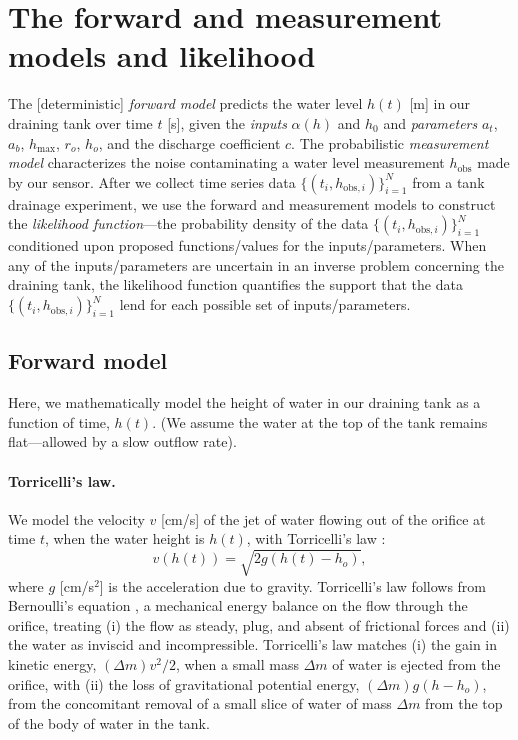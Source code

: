 \documentclass[openacc]{rsproca_new}%
\newcommand\thedata {$\{(t_i,h_{\text{obs}, i})\}_{i=1}^{N}$\xspace}
\begin{document}
\section{The forward and measurement models and likelihood} \label{sec:forward_model}
The [deterministic] \emph{forward model} predicts the water level $h(t)$ [m] in our draining tank over time $t$ [s], given the \emph{inputs} $\alpha(h)$ and $h_0$ and \emph{parameters} $a_t$, $a_b$, $h_{\text{max}}$, $r_o$, $h_o$, and the discharge coefficient $c$. 
The probabilistic \emph{measurement model} characterizes the noise contaminating a water level measurement $h_{\text{obs}}$ made by our sensor.
After we collect time series data \thedata from a tank drainage experiment, we use the forward and measurement models to construct the \emph{likelihood function}---the probability density of the data \thedata conditioned upon proposed functions/values for the inputs/parameters. 
When any of the inputs/parameters are uncertain in an inverse problem concerning the draining tank, the likelihood function quantifies the support that the data \thedata lend for each possible set of inputs/parameters.

\subsection{Forward model}
Here, we mathematically model the height of water in our draining tank as a function of time, $h(t)$. (We assume the water at the top of the tank remains flat---allowed by a slow outflow rate). 

\paragraph{Torricelli's law.}
We model the velocity $v$ [cm/s] of the jet of water flowing out of the orifice at time $t$, when the water height is $h(t)$, with Torricelli's law \cite{d2021torricelli}:
\begin{equation}
	v(h(t)) =  \sqrt{2 g(h(t)-h_o)}, \label{eq:Torricelli}
\end{equation} where $g$ [cm/s$^2$] is the acceleration due to gravity. Torricelli's law follows from Bernoulli's equation \cite{welty2020fundamentals}, a mechanical energy balance on the flow through the orifice, treating (i) the flow as steady, plug, and absent of frictional forces and (ii) the water as inviscid and incompressible.
Torricelli's law matches (i) the gain in kinetic energy, $(\Delta m) v^2/2$, when a small mass $\Delta m$ of water is ejected from the orifice, with (ii) the loss of gravitational potential energy, $(\Delta m)g(h-h_o)$, from the concomitant removal of a small slice of water of mass $\Delta m$ from the top of the body of water in the tank. \cite{groetsch1993inverse_tl,driver1998torricelli,williams2021vessel}
\end{document}
